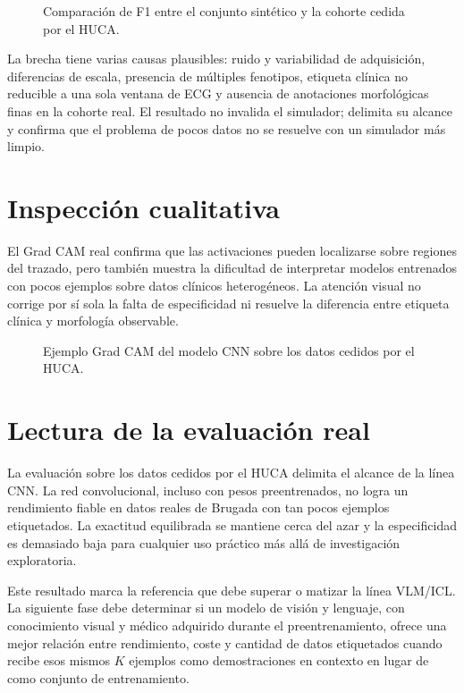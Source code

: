 \begin{figure}[H]
  \centering
  \caption{Comparación de F1 entre el conjunto sintético y la cohorte cedida por el HUCA.}
  \label{fig:sim_vs_real_f1}
\end{figure}

La brecha tiene varias causas plausibles: ruido y variabilidad de adquisición, diferencias de escala, presencia de múltiples fenotipos, etiqueta clínica no reducible a una sola ventana de ECG y ausencia de anotaciones morfológicas finas en la cohorte real. El resultado no invalida el simulador; delimita su alcance y confirma que el problema de pocos datos no se resuelve con un simulador más limpio.

\section{Inspección cualitativa}

El Grad CAM real confirma que las activaciones pueden localizarse sobre regiones del trazado, pero también muestra la dificultad de interpretar modelos entrenados con pocos ejemplos sobre datos clínicos heterogéneos. La atención visual no corrige por sí sola la falta de especificidad ni resuelve la diferencia entre etiqueta clínica y morfología observable.

\begin{figure}[H]
  \centering
  \caption{Ejemplo Grad CAM del modelo CNN sobre los datos cedidos por el HUCA.}
  \label{fig:cnn_huca_gradcam}
\end{figure}

\section{Lectura de la evaluación real}

La evaluación sobre los datos cedidos por el HUCA delimita el alcance de la línea CNN. La red convolucional, incluso con pesos preentrenados, no logra un rendimiento fiable en datos reales de Brugada con tan pocos ejemplos etiquetados. La exactitud equilibrada se mantiene cerca del azar y la especificidad es demasiado baja para cualquier uso práctico más allá de investigación exploratoria.

Este resultado marca la referencia que debe superar o matizar la línea VLM/ICL. La siguiente fase debe determinar si un modelo de visión y lenguaje, con conocimiento visual y médico adquirido durante el preentrenamiento, ofrece una mejor relación entre rendimiento, coste y cantidad de datos etiquetados cuando recibe esos mismos \(K\) ejemplos como demostraciones en contexto en lugar de como conjunto de entrenamiento.
